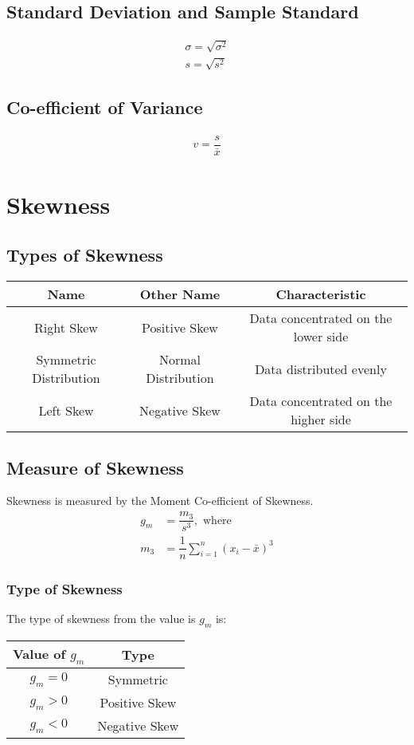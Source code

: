 \subsection{Standard Deviation and Sample Standard}
\begin{align}
	\sigma = \sqrt{\sigma^2}\\
	s=\sqrt{s^2}
\end{align}

\subsection{Co-efficient of Variance}
\begin{align}
	v = \dfrac{s}{\bar{x}}
\end{align}

\section{Skewness}
\subsection{Types of Skewness}
\begin{table}[!h]
	\centering
	\begin{tabular}{c|c|c}
		Name & Other Name & Characteristic\\
		\hline
		Right Skew & Positive Skew & Data concentrated on the lower side\\
		Symmetric Distribution & Normal Distribution & Data distributed evenly\\
		Left Skew & Negative Skew & Data concentrated on the higher side
	\end{tabular}
\end{table}

\subsection{Measure of Skewness}
Skewness is measured by the Moment Co-efficient of Skewness.
\begin{align}
	g_m &= \dfrac{m_3}{s^3}, \text{ where}\\
	m_3 &= \dfrac{1}{n}\sum_{i=1}^{n} \left( x_i - \bar{x} \right)^3
\end{align}

\subsubsection{Type of Skewness}
The type of skewness from the value is $g_m$ is:
\begin{table}[h!]
	\centering
	\begin{tabular}{c|c}
		Value of $g_m$ & Type\\
		\hline
		$g_m = 0$ & Symmetric\\
		$g_m > 0$ & Positive Skew\\
		$g_m < 0$ & Negative Skew
	\end{tabular}
\end{table}

